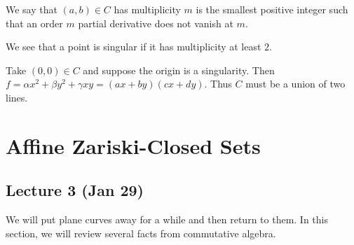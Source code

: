 \documentclass[twoside, 10pt]{article}
\begin{document}
    \begin{defn}[Multiplicity] We say that $(a,b) \in C$ has multiplicity $m$
    is the smallest positive integer such that an order $m$ partial derivative
does not vanish at $m$.  \end{defn}

    We see that a point is singular if it has multiplicity at least $2$.

    \begin{exm} Take $(0,0) \in C$ and suppose the origin is a
    singularity. Then $f = \alpha x^2 + \beta y^2 + \gamma xy =
(ax+by)(cx+dy)$. Thus $C$ must be a union of two lines.  \end{exm}

    \section{Affine Zariski-Closed Sets} \subsection{Lecture 3 (Jan 29)}

    We will put plane curves away for a while and then return to them. In this
    section, we will review several facts from commutative algebra.
\end{document}
